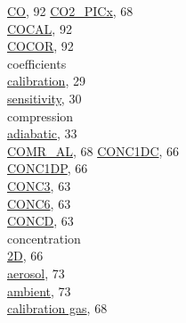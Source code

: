 \documentclass[
]{article}
\begin{document}
\href{./6-air-chemistry-measurements.html\#comr-al}{CO}, 92
\href{./6-air-chemistry-measurements.html\#co2-pic}{CO2\_PICx}, 68\\
\href{./10-obsolete-variables.html\#co-vars}{COCAL}, 92\\
\href{./10-obsolete-variables.html\#co-vars}{COCOR}, 92\\
coefficients\\
\hspace*{0.333em}\hspace*{0.333em}\href{./1-general-information-about-data-files.html\#background-information}{calibration},
29\\
\hspace*{0.333em}\hspace*{0.333em}\href{./4-the-state-of-the-atmosphere.html\#akrd}{sensitivity},
30\\
compression\\
\hspace*{0.333em}\hspace*{0.333em}\href{./4-the-state-of-the-atmosphere.html\#recovery-t}{adiabatic},
33\\
\href{./6-air-chemistry-measurements.html\#comr-al}{COMR\_AL}, 68
\href{./5-cloud-physics-variables.html\#conc2d}{CONC1DC}, 66\\
\href{./5-cloud-physics-variables.html\#conc2d}{CONC1DP}, 66\\
\href{./5-cloud-physics-variables.html\#concentration}{CONC3}, 63\\
\href{./5-cloud-physics-variables.html\#concentration}{CONC6}, 63\\
\href{./5-cloud-physics-variables.html\#concentration}{CONCD}, 63\\
concentration\\
\hspace*{0.333em}\hspace*{0.333em}\href{./5-cloud-physics-variables.html\#conc2d}{2D},
66\\
\hspace*{0.333em}\hspace*{0.333em}\href{./7-aerosol-particle-measurements.html\#concu-concp}{aerosol},
73\\
\hspace*{0.333em}\hspace*{0.333em}\href{./7-aerosol-particle-measurements.html\#concn}{ambient},
73\\
\hspace*{0.333em}\hspace*{0.333em}\href{./6-air-chemistry-measurements.html\#comr-al}{calibration
gas}, 68\\
\end{document}
